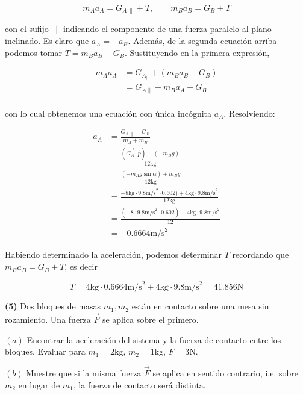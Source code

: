 \documentclass[12pt]{article}
\theoremstyle{definition}
\begin{document}
\begin{equation*}
    m_A a_{A} = G_{A ~ \parallel} + T, \qquad m_B a_B = G_B + T 
\end{equation*}

con el sufijo $\parallel$ indicando el componente de una fuerza paralelo al
plano inclinado. Es claro que $a_A = -a_B$. Además, de la segunda ecuación
arriba podemos tomar $T = m_B a_B - G_B$. Sustituyendo en la primera expresión, 

\begin{align*}
    m_Aa_A 
    &= G_A_{\parallel} + \left( m_B a_B - G_B \right)  \\ 
    &= G_{A \parallel} - m_Ba_A - G_B \\ 
\end{align*}

con lo cual obtenemos una ecuación con única incógnita $a_A$. Resolviendo: 

\begin{align*}
    a_A 
    &= \frac{ G_{A ~ \parallel}- G_B }{m_A + m_B}\\ 
    &= \frac{( \vec{G_A} \cdot \hat{p} ) - (- m_Bg )}{12\text{kg}}\\
    &= \frac{( -m_A g \sin \alpha) + m_Bg}{12\text{kg}}\\ 
    &=\frac{-8\text{kg}\cdot 9.8 \text{m/s}^2\cdot 0.602) + 4\text{kg}\cdot 9.8
    \text{m/s}^2}{12\text{kg}} \\ 
    &=\frac{(-8\cdot 9.8 \text{m/s}^2\cdot 0.602) - 4\text{kg}\cdot 9.8
    \text{m/s}^2}{12} \\ 
    &= -0.6664 \text{m/s}^2
\end{align*}

Habiendo determinado la aceleración, podemos determinar $T$ recordando que $m_B
a_B = G_B + T$, es decir 

\begin{equation*}
    T = 4\text{kg}\cdot0.6664 \text{m/s}^2 + \text{4kg}\cdot 9.8 \text{m/s}^2 =
    41.856\text{N}
\end{equation*}

\pagebreak 

\begin{shaded}
    \textbf{(5)} Dos bloques de masas $m_1, m_2$ están en contacto sobre una
    mesa sin rozamiento. Una fuerza $\vec{F}$ se aplica sobre el primero. 

    $(a)$ Encontrar la aceleración del sistema y la fuerza de contacto entre
    los bloques. Evaluar para $m_1=2$kg, $m_2 = 1$kg, $F = 3$N.

    $(b)$ Muestre que si la misma fuerza $\vec{F}$ se aplica en sentido
    contrario, i.e. sobre $m_2$ en lugar de $m_1$, la fuerza de contacto será
    distinta.
\end{shaded}
\end{document}
